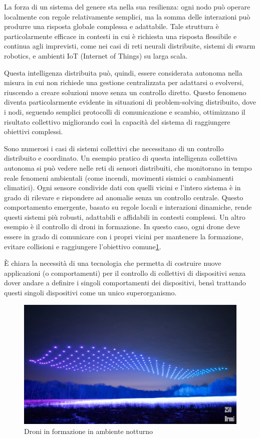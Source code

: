 \documentclass[12pt,a4paper,openright,twoside]{book}
\begin{document}
La forza di un sistema del genere sta nella sua resilienza: ogni nodo può operare localmente con regole relativamente semplici, ma la somma delle interazioni può produrre una risposta globale complessa e adattabile. Tale struttura è particolarmente efficace in contesti in cui è richiesta una risposta flessibile e continua agli imprevisti, come nei casi di reti neurali distribuite, sistemi di swarm robotics, e ambienti IoT (Internet of Things) su larga scala.

Questa intelligenza distribuita può, quindi, essere considerata autonoma nella misura in cui non richiede una gestione centralizzata per adattarsi o evolversi, riuscendo a creare soluzioni nuove senza un controllo diretto. Questo fenomeno diventa particolarmente evidente in situazioni di problem-solving distribuito, dove i nodi, seguendo semplici protocolli di comunicazione e scambio, ottimizzano il risultato collettivo migliorando così la capacità del sistema di raggiungere obiettivi complessi.

Sono numerosi i casi di sistemi collettivi che necessitano di un controllo distribuito e coordinato. Un esempio pratico di questa intelligenza collettiva autonoma si può vedere nelle reti di sensori distribuiti, che monitorano in tempo reale fenomeni ambientali (come incendi, movimenti sismici o cambiamenti climatici). Ogni sensore condivide dati con quelli vicini e l'intero sistema è in grado di rilevare e rispondere ad anomalie senza un controllo centrale. Questo comportamento emergente, basato su regole locali e interazioni dinamiche, rende questi sistemi più robusti, adattabili e affidabili in contesti complessi. Un altro esempio è il controllo di droni in formazione. In questo caso, ogni drone deve essere in grado di comunicare con i propri vicini per mantenere la formazione, evitare collisioni e raggiungere l'obiettivo comune\cref{fig:drones}.

È chiara la necessità di una tecnologia che permetta di costruire nuove applicazioni (o comportamenti) per il controllo di collettivi di dispositivi senza dover andare a definire i singoli comportamenti dei dispositivi, bensì trattando questi singoli dispositivi come un unico superorganismo.

\begin{figure}
    \centering
    \includegraphics[width=.7\linewidth]{figures/drones.jpg}
    \caption{Droni in formazione in ambiente notturno}
    \label{fig:drones}
\end{figure}
\end{document}
